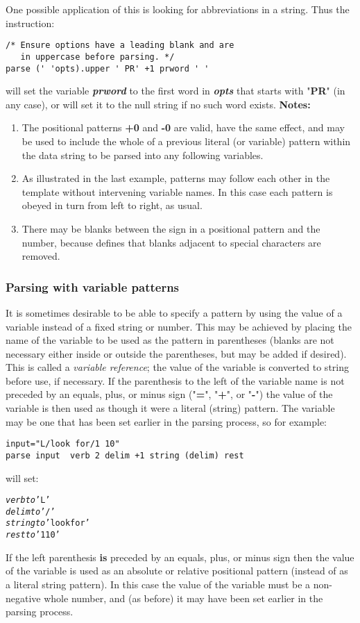  One possible application of this is looking for abbreviations in a
string. Thus the instruction:
\begin{lstlisting}
/* Ensure options have a leading blank and are
   in uppercase before parsing. */
parse (' 'opts).upper ' PR' +1 prword ' '
\end{lstlisting}
will set the variable \textbf{\emph{prword}} to the first word
in \textbf{\emph{opts}} that starts with "\textbf{PR}" (in
any case), or will set it to the null string if no such word exists.
 \textbf{Notes:}
\begin{enumerate}
\item The positional patterns \textbf{+0} and \textbf{-0} are valid,
have the same effect, and may be used to include the whole of a previous
literal (or variable) pattern within the data string to be parsed into
any following variables.
\item As illustrated in the last example, patterns may follow each other
in the template without intervening variable names.  In this case each
pattern is obeyed in turn from left to right, as usual.
\item There may be blanks between the sign in a positional pattern and
the number, because \nr{} defines that blanks adjacent to special
characters are removed.
\end{enumerate}
\subsubsection{Parsing with variable patterns}
 It is sometimes desirable to be able to specify a pattern by using
the value of a variable instead of a fixed string or number.
This may be achieved by placing the name of the variable to be used as
the pattern in parentheses (blanks are not necessary either inside or
outside the parentheses, but may be added if desired).
This is called a \emph{variable reference}; the value of the variable
is converted to string before use, if necessary.
 If the parenthesis to the left of the variable name is not preceded
by an equals, plus, or minus sign ("\textbf{=}",
"\textbf{+}", or "\textbf{-}")
the value of the variable is then used as though it were a literal
(string) pattern.
The variable may be one that has been set earlier in the parsing
process, so for example:
\begin{lstlisting}
input="L/look for/1 10"
parse input  verb 2 delim +1 string (delim) rest
\end{lstlisting}
will set:
\begin{alltt}
\emph{verb} \emph{to} 'L'
\emph{delim} \emph{to} '/'
\emph{string} \emph{to} 'look for'
\emph{rest} \emph{to} '1 10'
\end{alltt}
 If the left parenthesis \textbf{is} preceded by an equals, plus,
or minus sign then the value of the variable is used as an absolute or
relative positional pattern (instead of as a literal string pattern).
In this case the value of the variable must be a non-negative
whole number, and (as before) it may have been set earlier in the
parsing process.
\index{,}
\index{,}
\index{,}
\index{,}
